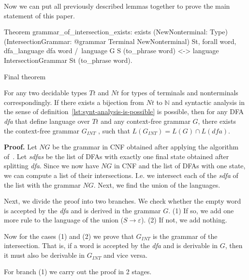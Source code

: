 Now we can put all previously described lemmas together to prove the main statement of this paper.

\begin{listing}[h]
    \begin{pyglist}[language=coq, numbers=none, numbersep=5pt]

Theorem grammar_of_intersection_exists:
  exists 
   (NewNonterminal: Type) 
   (IntersectionGrammar: 
      @grammar Terminal NewNonterminal) St,
  forall word,
    dfa_language dfa word /\ 
	    language G S (to_phrase word) <->
    language IntersectionGrammar St 
	         (to_phrase word).
   \end{pyglist}
\caption{Final theorem}
\label{lst:lang-eq}
\end{listing}

\begin{theorem}
    For any two decidable types $Tt$ and $Nt$ for types of terminals and nonterminals correspondingly.
    If there exists a bijection from $Nt$ to $\mathbb{N}$ and syntactic analysis in the sense of definition~\ref{lst:synt-analysis-is-possible} is possible, then for any DFA \textit{dfa} that define language over $Tt$ and any context-free grammar $G$, there exists the context-free grammar $G_{INT}$ , such that $L(G_{INT}) = L(G) \cap L(\textit{dfa})$.
\end{theorem}   

\textbf{Proof.} 
Let $NG$ be the grammar in CNF obtained after applying the algorithm of~\cite{smolkaHofmann2016}. Let \textit{sdfas} be the list of DFAs with exactly one final state obtained after splitting \textit{dfa}.
Since we now have $NG$ in CNF and the list of DFAs with one state, we can compute a list of their intersections.
I.e. we intersect each of the \textit{sdfa} of the list with the grammar $NG$.
Next, we find the union of the languages. 

Next, we divide the proof into two branches.
We check whether the empty word is accepted by the \textit{dfa} and is derived in the grammar $G$.
(1) If so, we add one more rule to the language of the union ($ S \to \varepsilon$). (2) If not, we add nothing.

Now for the cases (1) and (2) we prove that $G_{INT}$ is the grammar of the intersection.
That is, if a word is accepted by the \textit{dfa} and is derivable in $G$, then it must also be derivable in $G_{INT}$ and vice versa.

For branch (1) we carry out the proof in 2 stages.

